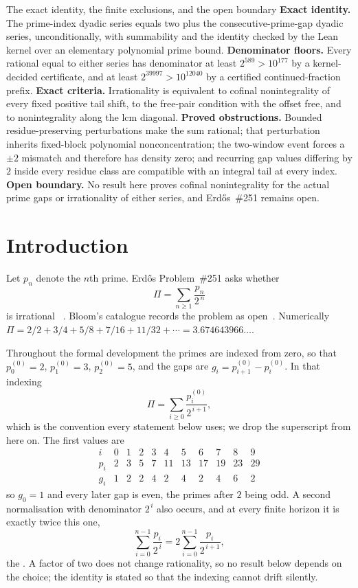 \documentclass[11pt]{article}
\begin{document}
\begin{paperresult}{The exact identity, the finite exclusions, and the open boundary}
\textbf{Exact identity.} The prime-index dyadic series equals two plus the
consecutive-prime-gap dyadic series, unconditionally, with summability and the
identity checked by the Lean kernel over an elementary polynomial prime bound.
\textbf{Denominator floors.} Every rational equal to either series has
denominator at least $2^{589}>10^{177}$ by a kernel-decided certificate, and at
least $2^{39997}>10^{12040}$ by a certified continued-fraction prefix.
\textbf{Exact criteria.} Irrationality is equivalent to cofinal nonintegrality
of every fixed positive tail shift, to the free-pair condition with the offset
free, and to nonintegrality along the lcm diagonal.
\textbf{Proved obstructions.} Bounded residue-preserving perturbations make the
sum rational; that perturbation inherits fixed-block polynomial
nonconcentration; the two-window event forces a $\pm2$ mismatch and therefore
has density zero; and recurring gap values differing by $2$ inside every
residue class are compatible with an integral tail at every index.
\textbf{Open boundary.} No result here proves cofinal nonintegrality for the
actual prime gaps or irrationality of either series, and Erd\H{o}s~\#251
remains open.
\end{paperresult}

\section{Introduction}\label{long251:sec:problem}

Let $p_n$ denote the $n$th prime.  Erd\H{o}s Problem~\#251 asks whether
\[
 \Pi=\sum_{n\ge1}\frac{p_n}{2^{\,n}}
\]
is irrational~\cite[p.~94]{erdos1958}\cite[p.~62]{erdosgraham1980}%
\cite[p.~103]{erdos1988}.  Bloom's catalogue records the problem as
open~\cite{erdosproblems}.  Numerically
$\Pi=2/2+3/4+5/8+7/16+11/32+\cdots=3.674643966\ldots$.

Throughout the formal development the primes are indexed from zero, so that
$p^{(0)}_0=2$, $p^{(0)}_1=3$, $p^{(0)}_2=5$, and the gaps are
$g_i=p^{(0)}_{i+1}-p^{(0)}_i$.  In that indexing
\[
 \Pi=\sum_{i\ge0}\frac{p^{(0)}_i}{2^{\,i+1}} ,
\]
which is the convention every statement below uses; we drop the superscript
from here on.  The first values are
\[
 \begin{array}{c|cccccccccc}
  i   & 0&1&2&3&4 &5 &6 &7 &8 &9\\\hline
  p_i & 2&3&5&7&11&13&17&19&23&29\\
  g_i & 1&2&2&4&2 &4 &2 &4 &6 &2
 \end{array}
\]
so $g_0=1$ and every later gap is even, the primes after $2$ being odd.
A second normalisation with denominator $2^{\,i}$ also occurs,
and at every finite horizon it is exactly twice this one,
\[
 \sum_{i=0}^{n-1}\frac{p_i}{2^{\,i}}
 =2\sum_{i=0}^{n-1}\frac{p_i}{2^{\,i+1}} ,
\]
the
.  A factor of two does not change rationality, so no result
below depends on the choice; the identity is stated so that the indexing cannot
drift silently.
\end{document}
